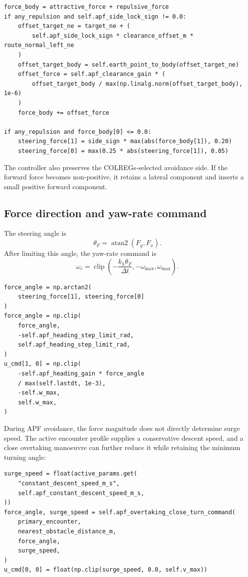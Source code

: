 \documentclass[11pt,a4paper]{article}
\begin{document}
\begin{lstlisting}
force_body = attractive_force + repulsive_force
if any_repulsion and self.apf_side_lock_sign != 0.0:
    offset_target_ne = target_ne + (
        self.apf_side_lock_sign * clearance_offset_m * route_normal_left_ne
    )
    offset_target_body = self.earth_point_to_body(offset_target_ne)
    offset_force = self.apf_clearance_gain * (
        offset_target_body / max(np.linalg.norm(offset_target_body), 1e-6)
    )
    force_body += offset_force

if any_repulsion and force_body[0] <= 0.0:
    steering_force[1] = side_sign * max(abs(force_body[1]), 0.20)
    steering_force[0] = max(0.25 * abs(steering_force[1]), 0.05)
\end{lstlisting}

The controller also preserves the COLREGs-selected avoidance side. If the forward force becomes non-positive, it retains a lateral component and inserts a small positive forward component.

\subsection{Force direction and yaw-rate command}

The steering angle is
\begin{equation}
\theta_F=\operatorname{atan2}(F_y,F_x).
\end{equation}
After limiting this angle, the yaw-rate command is
\begin{equation}
\omega_c=\operatorname{clip}\left(
-\frac{k_h\theta_F}{\Delta t},
-\omega_{\max},\omega_{\max}
\right).
\end{equation}

\begin{lstlisting}
force_angle = np.arctan2(
    steering_force[1], steering_force[0]
)
force_angle = np.clip(
    force_angle,
    -self.apf_heading_step_limit_rad,
    self.apf_heading_step_limit_rad,
)
u_cmd[1, 0] = np.clip(
    -self.apf_heading_gain * force_angle
    / max(self.lastdt, 1e-3),
    -self.w_max,
    self.w_max,
)
\end{lstlisting}

During APF avoidance, the force magnitude does not directly determine surge
speed. The active encounter profile supplies a conservative descent speed,
and a close overtaking manoeuvre can further reduce it while retaining the
minimum turning angle:

\begin{lstlisting}
surge_speed = float(active_params.get(
    "constant_descent_speed_m_s",
    self.apf_constant_descent_speed_m_s,
))
force_angle, surge_speed = self.apf_overtaking_close_turn_command(
    primary_encounter,
    nearest_obstacle_distance_m,
    force_angle,
    surge_speed,
)
u_cmd[0, 0] = float(np.clip(surge_speed, 0.0, self.v_max))
\end{lstlisting}
\end{document}
